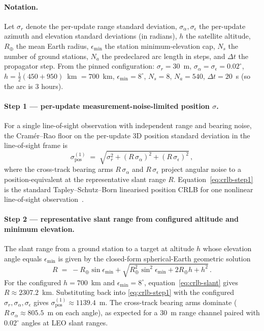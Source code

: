 \documentclass{article}
\begin{document}
\paragraph{Notation.}
Let $\sigma_r$ denote the per-update range standard deviation, $\sigma_{\alpha},\sigma_{\epsilon}$ the per-update azimuth and elevation standard deviations (in radians), $h$ the satellite altitude, $R_\oplus$ the mean Earth radius, $\epsilon_{\min}$ the station minimum-elevation cap, $N_s$ the number of ground stations, $N_a$ the predeclared arc length in steps, and $\Delta t$ the propagator step. From the pinned configuration: $\sigma_r=30$~m, $\sigma_{\alpha}=\sigma_{\epsilon}=0.02^{\circ}$, $h=\tfrac12(450{+}950)$~km $=700$~km, $\epsilon_{\min}=8^{\circ}$, $N_s=8$, $N_a=540$, $\Delta t=20$~s (so the arc is $3$ hours).

\paragraph{Step 1 --- per-update measurement-noise-limited position $\sigma$.}
For a single line-of-sight observation with independent range and bearing noise, the Cram\'er--Rao floor on the per-update 3D position standard deviation in the line-of-sight frame is
\begin{equation}
\sigma^{(1)}_{\mathrm{pos}} \;=\; \sqrt{\sigma_r^{2} + (R\,\sigma_{\alpha})^{2} + (R\,\sigma_{\epsilon})^{2}}\,,
\label{eq:crlb-step1}
\end{equation}
where the cross-track bearing arms $R\,\sigma_{\alpha}$ and $R\,\sigma_{\epsilon}$ project angular noise to a position-equivalent at the representative slant range $R$. Equation~\eqref{eq:crlb-step1} is the standard Tapley--Schutz--Born linearised position CRLB for one nonlinear line-of-sight observation~\cite{tapley2004statistical}.

\paragraph{Step 2 --- representative slant range from configured altitude and minimum elevation.}
The slant range from a ground station to a target at altitude $h$ whose elevation angle equals $\epsilon_{\min}$ is given by the closed-form spherical-Earth geometric solution
\begin{equation}
R \;=\; -R_\oplus\sin\epsilon_{\min} + \sqrt{R_\oplus^{2}\sin^{2}\epsilon_{\min} + 2R_\oplus h + h^{2}}\,.
\label{eq:crlb-slant}
\end{equation}
For the configured $h=700$~km and $\epsilon_{\min}=8^{\circ}$, equation~\eqref{eq:crlb-slant} gives $R\approx 2307.2$~km. Substituting back into \eqref{eq:crlb-step1} with the configured $\sigma_r,\sigma_{\alpha},\sigma_{\epsilon}$ gives $\sigma^{(1)}_{\mathrm{pos}}\approx 1139.4$~m. The cross-track bearing arms dominate ($R\,\sigma_{\alpha}\approx 805.5$~m on each angle), as expected for a 30~m range channel paired with $0.02^{\circ}$ angles at LEO slant ranges.
\end{document}
